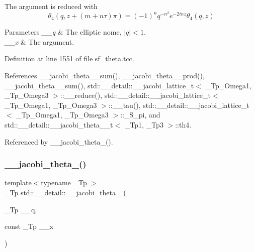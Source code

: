 The argument is reduced with \[ \theta_4(q, z+(m + n\tau)\pi) = (-1)^n q^{-n^2}e^{-2inz}\theta_4(q, z) \]


\begin{DoxyParams}{Parameters}
{\em \+\_\+\+\_\+q} & The elliptic nome, $ |q| < 1 $. \\
\hline
{\em \+\_\+\+\_\+x} & The argument. \\
\hline
\end{DoxyParams}


Definition at line 1551 of file sf\+\_\+theta.\+tcc.



References \+\_\+\+\_\+jacobi\+\_\+theta\+\_\+\_\+sum(), \+\_\+\+\_\+jacobi\+\_\+theta\+\_\+\_\+prod(), \+\_\+\+\_\+jacobi\+\_\+theta\+\_\+\_\+sum(), std\+::\+\_\+\+\_\+detail\+::\+\_\+\+\_\+jacobi\+\_\+lattice\+\_\+t$<$ \+\_\+\+Tp\+\_\+\+Omega1, \+\_\+\+Tp\+\_\+\+Omega3 $>$\+::\+\_\+\+\_\+reduce(), std\+::\+\_\+\+\_\+detail\+::\+\_\+\+\_\+jacobi\+\_\+lattice\+\_\+t$<$ \+\_\+\+Tp\+\_\+\+Omega1, \+\_\+\+Tp\+\_\+\+Omega3 $>$\+::\+\_\+\+\_\+tau(), std\+::\+\_\+\+\_\+detail\+::\+\_\+\+\_\+jacobi\+\_\+lattice\+\_\+t$<$ \+\_\+\+Tp\+\_\+\+Omega1, \+\_\+\+Tp\+\_\+\+Omega3 $>$\+::\+\_\+\+S\+\_\+pi, and std\+::\+\_\+\+\_\+detail\+::\+\_\+\+\_\+jacobi\+\_\+theta\+\_\+\_\+t$<$ \+\_\+\+Tp1, \+\_\+\+Tp3 $>$\+::th4.



Referenced by \+\_\+\+\_\+jacobi\+\_\+theta\+\_().

\mbox{\label{namespacestd_1_1____detail_a0e4199a4d77f33d27b09063b25c99b7f}} 
\subsubsection{\texorpdfstring{\+\_\+\+\_\+jacobi\+\_\+theta\+\_()}{\_\_jacobi\_theta\_4()}\hspace{0.1cm}{\footnotesize\ttfamily [2/2]}}
{\footnotesize\ttfamily template$<$typename \+\_\+\+Tp $>$ \\
\+\_\+\+Tp std\+::\+\_\+\+\_\+detail\+::\+\_\+\+\_\+jacobi\+\_\+theta\+\_ (\begin{DoxyParamCaption}\item[{\+\_\+\+Tp}]{\+\_\+\+\_\+q,  }\item[{const \+\_\+\+Tp}]{\+\_\+\+\_\+x }\end{DoxyParamCaption})}

